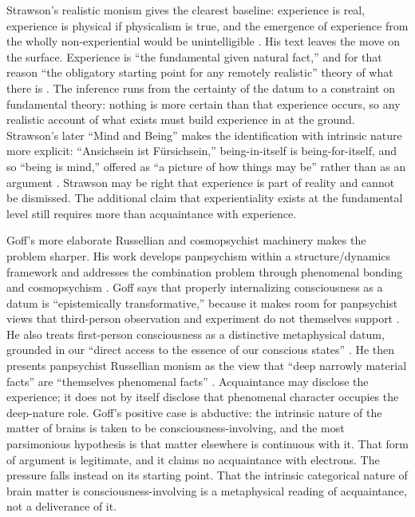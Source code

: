 Strawson's realistic monism gives the clearest baseline: experience is real, experience is physical if physicalism is true, and the emergence of experience from the wholly non-experiential would be unintelligible \citep{strawson2006}. His text leaves the move on the surface. Experience is ``the fundamental given natural fact,'' and for that reason ``the obligatory starting point for any remotely realistic'' theory of what there is \citep[4]{strawson2006}. The inference runs from the certainty of the datum to a constraint on fundamental theory: nothing is more certain than that experience occurs, so any realistic account of what exists must build experience in at the ground. Strawson's later ``Mind and Being'' makes the identification with intrinsic nature more explicit: ``Ansichsein ist F{\"u}rsichsein,'' being-in-itself is being-for-itself, and so ``being is mind,'' offered as ``a picture of how things may be'' rather than as an argument \citep[80--82]{strawson2017primacy}. Strawson may be right that experience is part of reality and cannot be dismissed. The additional claim that experientiality exists at the fundamental level still requires more than acquaintance with experience.

Goff's more elaborate Russellian and cosmopsychist machinery makes the problem sharper. His work develops panpsychism within a structure/dynamics framework and addresses the combination problem through phenomenal bonding and cosmopsychism \citep{goff2017cfr,goff2017bonding,goff2019cosmopsychism}. Goff says that properly internalizing consciousness as a datum is ``epistemically transformative,'' because it makes room for panpsychist views that third-person observation and experiment do not themselves support \citep[9--10]{goff2017cfr}. He also treats first-person consciousness as a distinctive metaphysical datum, grounded in our ``direct access to the essence of our conscious states'' \citep[265]{goff2017cfr}. He then presents panpsychist Russellian monism as the view that ``deep narrowly material facts'' are ``themselves phenomenal facts'' \citep[144]{goff2017cfr}. Acquaintance may disclose the experience; it does not by itself disclose that phenomenal character occupies the deep-nature role. Goff's positive case is abductive: the intrinsic nature of the matter of brains is taken to be consciousness-involving, and the most parsimonious hypothesis is that matter elsewhere is continuous with it. That form of argument is legitimate, and it claims no acquaintance with electrons. The pressure falls instead on its starting point. That the intrinsic categorical nature of brain matter is consciousness-involving is a metaphysical reading of acquaintance, not a deliverance of it.

